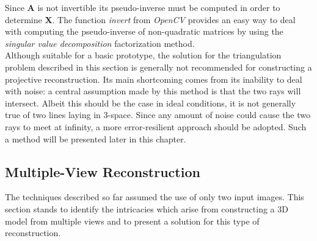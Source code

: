\documentclass[12pt,a4paper,twoside,openright]{report}
\begin{document}
Since \textbf{A} is not invertible its pseudo-inverse must be computed in order to determine \textbf{X}. The function \emph{invert} from \emph{OpenCV} provides an easy way to deal with computing the pseudo-inverse of non-quadratic matrices by using the \emph{singular value decomposition}\cite[p.~82]{Suli+2003} factorization method.\\
\linebreak
Although suitable for a basic prototype, the solution for the triangulation problem described in this section is generally not recommended for constructing a projective reconstruction. Its main shortcoming comes from its inability to deal with noise: a central assumption made by this method is that the two rays will intersect. Albeit this should be the case in ideal conditions, it is not generally true of two lines laying in 3-space. Since any amount of noise could cause the two rays to meet at infinity, a more error-resilient approach should be adopted. Such a method will be presented later in this chapter.


\subsection{Multiple-View Reconstruction}
The techniques described so far assumed the use of only two input images. This section stands to identify the intricacies which arise from constructing a 3D model from multiple views and to present a solution for this type of reconstruction.
\end{document}

